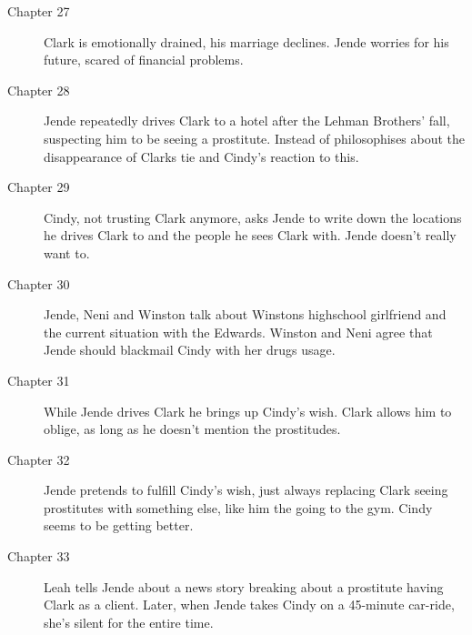 \documentclass{article}
\begin{document}
\begin{description}
 \item[Chapter 27] Clark is emotionally drained, his marriage declines. Jende worries for his future, scared of financial problems.
 \item[Chapter 28] Jende repeatedly drives Clark to a hotel after the Lehman Brothers' fall, suspecting him to be seeing a prostitute. Instead of philosophises about the disappearance of Clarks tie and Cindy's reaction to this.
 \item[Chapter 29] Cindy, not trusting Clark anymore, asks Jende to write down the locations he drives Clark to and the people he sees Clark with. Jende doesn't really want to. 
 \item[Chapter 30] Jende, Neni and Winston talk about Winstons highschool girlfriend and the current situation with the Edwards. Winston and Neni agree that Jende should blackmail Cindy with her drugs usage.
 \item[Chapter 31] While Jende drives Clark he brings up Cindy's wish. Clark allows him to oblige, as long as he doesn't mention the prostitudes.
 \item[Chapter 32] Jende pretends to fulfill Cindy's wish, just always replacing Clark seeing prostitutes with something else, like him the going to the gym. Cindy seems to be getting better.
 \item[Chapter 33] Leah tells Jende about a news story breaking about a prostitute having Clark as a client. Later, when Jende takes Cindy on a 45-minute car-ride, she's silent for the entire time. 
\end{description}   
\end{document}
